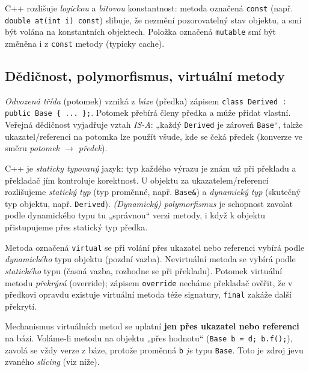 \documentclass[11pt,a4paper]{article}
\newcommand{\cd}{\lstinline[style=cpp]}
\begin{document}
\begin{poznamka}
C++ rozlišuje \emph{logickou} a \emph{bitovou} konstantnost: metoda označená \cd{const} (např. \cd{double at(int i) const}) slibuje, že nezmění pozorovatelný stav objektu, a smí být volána na konstantních objektech. Položka označená \cd{mutable} smí být změněna i z \cd{const} metody (typicky cache).
\end{poznamka}

\subsection{Dědičnost, polymorfismus, virtuální metody}

\begin{definice}
\emph{Odvozená třída} (potomek) vzniká z \emph{báze} (předka) zápisem \lstinline[style=cpp]!class Derived : public Base { ... };!. Potomek přebírá členy předka a může přidat vlastní. Veřejná dědičnost vyjadřuje vztah \emph{IS-A}: „každý \texttt{Derived} je zároveň \texttt{Base}``, takže ukazatel/referenci na potomka lze použít všude, kde se čeká předek (konverze ve směru \emph{potomek $\to$ předek}).
\end{definice}

\begin{definice}
C++ je \emph{staticky typovaný} jazyk: typ každého výrazu je znám už při překladu a překladač jím kontroluje korektnost. U objektu za ukazatelem/referencí rozlišujeme \emph{statický typ} (typ proměnné, např. \cd{Base&}) a \emph{dynamický typ} (skutečný typ objektu, např. \texttt{Derived}). \emph{(Dynamický) polymorfismus} je schopnost zavolat podle dynamického typu tu „správnou`` verzi metody, i když k objektu přistupujeme přes statický typ předka.
\end{definice}

\begin{definice}
Metoda označená \cd{virtual} se při volání přes ukazatel nebo referenci vybírá podle \emph{dynamického} typu objektu (pozdní vazba). Nevirtuální metoda se vybírá podle \emph{statického} typu (časná vazba, rozhodne se při překladu). Potomek virtuální metodu \emph{překrývá} (override); zápisem \cd{override} necháme překladač ověřit, že v předkovi opravdu existuje virtuální metoda téže signatury, \cd{final} zakáže další překrytí.
\end{definice}

\begin{intuice}
Mechanismus virtuálních metod se uplatní \textbf{jen přes ukazatel nebo referenci} na bázi. Voláme-li metodu na objektu „přes hodnotu`` (\cd{Base b = d; b.f();}), zavolá se vždy verze z báze, protože proměnná \texttt{b} \emph{je} typu \texttt{Base}. Toto je zdroj jevu zvaného \emph{slicing} (viz níže).
\end{intuice}
\end{document}
